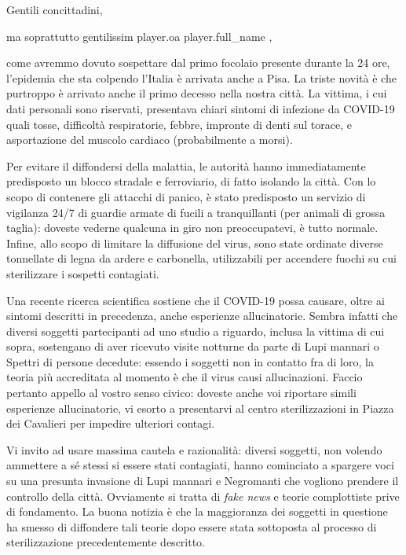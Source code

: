 \documentclass{letter}
\date{1 marzo 2020}
\begin{document}
\begin{letter}{}
\opening{Gentili concittadini,}

ma soprattutto gentilissim{{ player.oa }} {{ player.full_name }},

come avremmo dovuto sospettare dal primo focolaio presente durante la 24 ore, l'epidemia che sta colpendo l'Italia è arrivata anche a Pisa. La triste novità è che purtroppo è arrivato anche il primo decesso nella nostra città. La vittima, i cui dati personali sono riservati, presentava chiari sintomi di infezione da COVID-19 quali tosse, difficoltà respiratorie, febbre, impronte di denti sul torace, e asportazione del muscolo cardiaco (probabilmente a morsi).

Per evitare il diffondersi della malattia, le autorità hanno immediatamente predisposto un blocco stradale e ferroviario, di fatto isolando la città. Con lo scopo di contenere gli attacchi di panico, è stato predisposto un servizio di vigilanza 24/7 di guardie armate di fucili a tranquillanti (per animali di grossa taglia): doveste vederne qualcuna in giro non preoccupatevi, è tutto normale. Infine, allo scopo di limitare la diffusione del virus, sono state ordinate diverse tonnellate di legna da ardere e carbonella, utilizzabili per accendere fuochi su cui sterilizzare i sospetti contagiati.

Una recente ricerca scientifica sostiene che il COVID-19 possa causare, oltre ai sintomi descritti in precedenza, anche esperienze allucinatorie. Sembra infatti che diversi soggetti partecipanti ad uno studio a riguardo, inclusa la vittima di cui sopra, sostengano di aver ricevuto visite notturne da parte di Lupi mannari o Spettri di persone decedute: essendo i soggetti non in contatto fra di loro, la teoria più accreditata al momento è che il virus causi allucinazioni. Faccio pertanto appello al vostro senso civico: doveste anche voi riportare simili esperienze allucinatorie, vi esorto a presentarvi al centro sterilizzazioni in Piazza dei Cavalieri per impedire ulteriori contagi.

Vi invito ad usare massima cautela e razionalità: diversi soggetti, non volendo ammettere a sé stessi si essere stati contagiati, hanno cominciato a spargere voci su una presunta invasione di Lupi mannari e Negromanti che vogliono prendere il controllo della città. Ovviamente si tratta di \emph{fake news} e teorie complottiste prive di fondamento. La buona notizia è che la maggioranza dei soggetti in questione ha smesso di diffondere tali teorie dopo essere stata sottoposta al processo di sterilizzazione precedentemente descritto.


\end{letter}
\end{document}

